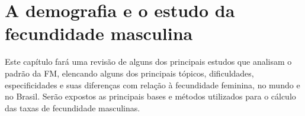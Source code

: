 \chapter{A demografia e o estudo da fecundidade masculina}

Este capítulo fará uma revisão de alguns dos principais estudos que analisam o padrão da FM, elencando alguns dos principais tópicos, dificuldades, especificidades e suas diferenças com relação à fecundidade feminina, no mundo e no Brasil. Serão expostos as principais bases e métodos utilizados para o cálculo das taxas de fecundidade masculinas. 













\begin{comment}



Coleman, David. “Tendencias de la fecundidad...”



[conceituar bem]

[Relevância]

porque não estudar apenas a fecundidade feminina?

porque a fecundidade masculina apresenta resultados diferentes da feminina no mesmo corte transversal? 

o que explica essas diferenças?

e porque é importante estuda-las?

quando se começou a falar de fecundidade masculina?

quem fala e porque fala?

autores mais relevantes, mais citados... 

 na america latina?

quais teorias sociais estão associadas aos estudos da FM?

- o papel do pai o papel da mãe?

- transição demográfica e mudanças nos papéis de gênero?

FM pelo mundo? diferentes culturas, transições (demográficas) e determinantes? 
principais autores e países estudados? quais são os padrões e diferenciais encontrados?

países poligâmicos? 

Religião? educação? Riqueza do país? afetam?

países em diferentes momentos da transição demográfica?

países com políticas pró-natalistas?



    
\end{comment}

